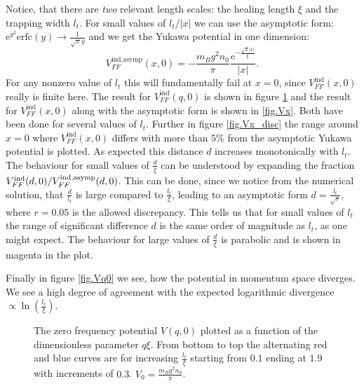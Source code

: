 Notice, that there are \textit{two} relevant length scales: the healing length $\xi$ and the trapping width $l_t$. For small values of $l_t/|x|$ we can use the asymptotic form: $\text{e}^{y^2}\text{erfc}(y) \to \frac{1}{\sqrt{\pi}y}$ and we get the Yukawa potential in one dimension:
\begin{equation}
V_{FF}^\text{ind,asymp}(x,0) = -\frac{m_Bg^2n_0}{\pi}\frac{\text{e}^{-\frac{\sqrt{2}|x|}{\xi}}}{|x|}.
\label{eq.Vx_asymp}
\end{equation}
For any nonzero value of $l_t$ this will fundamentally fail at $x=0$, since $V_{FF}^\text{ind}(x,0)$ really is finite here. The result for $V_{FF}^\text{ind}(q,0)$ is shown in figure \ref{fig.Vq} and the result for $V_{FF}^\text{ind}(x,0)$ along with the asymptotic form is shown in \ref{fig.Vx}. Both have been done for several values of $l_t$. Further in figure \ref{fig.Vx_disc} the range around $x=0$ where $V_{FF}^\text{ind}(x,0)$ differs with more than $5\%$ from the asymptotic Yukawa potential is plotted. As expected this distance $d$ increases monotonically with $l_t$. The behaviour for small values of $\frac{d}{\xi}$ can be understood by expanding the fraction $V_{FF}^\text{ind}(d,0)/V_{FF}^\text{ind,\text{asymp}}(d,0)$. This can be done, since we notice from the numerical solution, that $\frac{d}{l_t}$ is large compared to $\frac{l_t}{\xi}$, leading to an asymptotic form $d = \frac{l_t}{\sqrt{r}}$, where $r=0.05$ is the allowed discrepancy. This tells us that for small values of $l_t$ the range of significant difference $d$ is the same order of magnitude as $l_t$, as one might expect. The behaviour for large values of $\frac{d}{\xi}$ is parabolic and is shown in magenta in the plot.  

Finally in figure \ref{fig.Vq0} we see, how the potential in momentum space diverges. We see a high degree of agreement with the expected logarithmic divergence $\propto \ln\left(\frac{l_t}{\xi}\right)$. 

\begin{figure} 
\begin{center}  
  
\caption{The zero frequency potential $V(q,0)$ plotted as a function of the dimensionless parameter $q\xi$. From bottom to top the alternating red and blue curves are for increasing $\frac{l_t}{\xi}$ starting from $0.1$ ending at $1.9$ with increments of $0.3$. $V_0 = \frac{m_Bg^2n_0}{\pi}$.}  
\label{fig.Vq}  
\end{center}    
\end{figure}

